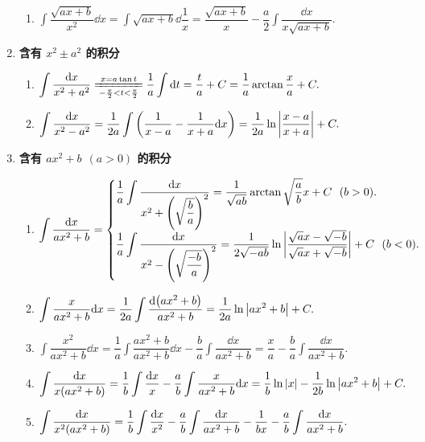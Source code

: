 \begin{enumerate}[label=\arabic{*}.]
\begin{enumerate}[label=\roman{*}.]
              \item $\displaystyle \int\dfrac{\sqrt{ax+b}}{x^2}\dd x =\int\sqrt{ax+b}\dd \dfrac{1}{x}=\dfrac{\sqrt{ax+b}}{x}-\dfrac{a}{2}\int\dfrac{\dd x}{x\sqrt{ax+b}}.$
          \end{enumerate}
    \item \textbf{含有 $x^2\pm a^2$ 的积分}
          \begin{enumerate}[label=\roman{*}.]
              \item $\displaystyle\int\dfrac{\dd x}{x^2+a^2}\xlongequal[-\frac{\pi}{2}<t<\frac{\pi}{2}]{x=a\tan t}\dfrac{1}{a}\int\dd t=\dfrac{t}{a}+C=\dfrac{1}{a}\arctan\dfrac{x}{a}+C.$
              \item $\displaystyle\int\dfrac{\dd x}{x^2-a^2}=\dfrac{1}{2a}\int\qty(\dfrac{1}{x-a}-\dfrac{1}{x+a}\dd x)=\dfrac{1}{2a}\ln\qty|\dfrac{x-a}{x+a}|+C.$
          \end{enumerate}
    \item \textbf{含有 $ax^2+b~~(a>0)$ 的积分}
          \begin{enumerate}[label=\roman{*}.]
              \item $\displaystyle \int\dfrac{\dd x}{ax^2+b}=\begin{cases}
                            \displaystyle \dfrac{1}{a}\int\dfrac{\dd x}{x^2+\qty(\sqrt{\dfrac{b}{a}})^2}=\dfrac{1}{\sqrt{ab}}\arctan\sqrt{\dfrac{a}{b}}x+C~~(b>0). \\
                            \displaystyle \dfrac{1}{a}\int\dfrac{\dd x}{x^2-\qty(\sqrt{\dfrac{-b}{a}})^2}=\dfrac{1}{2\sqrt{-ab}}\ln\qty|\dfrac{\sqrt{a}x-\sqrt{-b}}{\sqrt{a}x+\sqrt{-b}}|+C~~(b<0).
                        \end{cases}$
            \item $\displaystyle \int\dfrac{x}{ax^2+b}\dd x=\dfrac{1}{2a}\int\dfrac{\dd \qty(ax^2+b)}{ax^2+b}=\dfrac{1}{2a}\ln\qty|ax^2+b|+C.$
            \item $\displaystyle \int\dfrac{x^2}{ax^2+b}\dd x=\dfrac{1}{a}\int\dfrac{ax^2+b}{ax^2+b}\dd x-\dfrac{b}{a}\int\dfrac{\dd x}{ax^2+b}=\dfrac{x}{a}-\dfrac{b}{a}\int\dfrac{\dd x}{ax^2+b}.$
            \item $\displaystyle \int\dfrac{\dd x}{x\qty(ax^2+b)}=\dfrac{1}{b}\int\dfrac{\dd x}{x}-\dfrac{a}{b}\int\dfrac{x}{ax^2+b}\dd x=\dfrac{1}{b}\ln|x|-\dfrac{1}{2b}\ln\qty|ax^2+b|+C.$
            \item $\displaystyle \int\dfrac{\dd x}{x^2\qty(ax^2+b)}=\dfrac{1}{b}\int\dfrac{\dd x}{x^2}-\dfrac{a}{b}\int\dfrac{\dd x}{ax^2+b}-\dfrac{1}{bx}-\dfrac{a}{b}\int\dfrac{\dd x}{ax^2+b}.$

\end{enumerate}
\end{enumerate}
